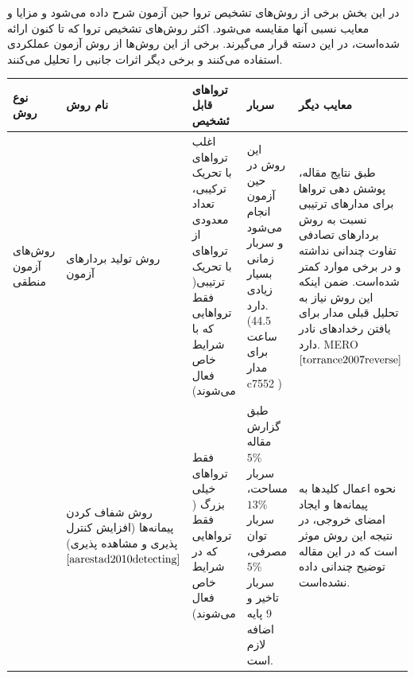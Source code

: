 در این بخش برخی از روش‌های تشخیص تروا حین آزمون شرح داده می‌شود و مزایا و معایب نسبی آنها مقایسه می‌شود. اکثر روش‌های تشخیص تروا که تا کنون ارائه شده‌است، در این دسته قرار می‌گیرند. برخی از این روش‌ها از روش آزمون عملکردی استفاده می‌کنند و برخی دیگر اثرات جانبی را تحلیل می‌کنند.
%
\begin{table}
	\label{tcomparison}
	\begin{tabular}{|p{1cm}||p{3cm}|p{3cm}|p{3cm}|p{3cm}|}
		\hline
		
		نوع روش & نام روش & تروا‌های قابل ئشخیص & سربار& معایب دیگر \\ \hline \hline
		روش‌ها‌‌ی آزمون منطقی& روش تولید بردارهای آزمون&اغلب تروا‌های با تحریک ترکیبی، تعداد معدودی از تروا‌های با تحریک ترتیبی( فقط تروا‌هایی که با شرایط خاص فعال می‌شوند)&این روش در حین آزمون انجام می‌شود و سربار زمانی بسیار زیادی دارد.(44.5 ساعت برای مدار c7552 )&طبق نتایج مقاله، پوشش دهی تروا‌ها برای مدارهای ترتیبی نسبت به روش بردارهای تصادفی تفاوت چندانی نداشته و در برخی موارد کمتر شده‌است. ضمن اینکه این روش نیاز به تحلیل قبلی مدار برای یافتن رخدادهای نادر دارد.
		MERO $\cite{torrance2007reverse}$
		\\ \cline{2-5}
		&روش شفاف کردن پیمانه‌ها (افزایش کنترل پذیری و مشاهده پذیری) $\cite{aarestad2010detecting}$ &فقط تروا‌های خیلی بزرگ ( فقط تروا‌هایی که در شرایط خاص فعال می‌شوند)&طبق گزارش مقاله $5\% $ سربار مساحت، $ 13\%$ سربار توان مصرفی، $5\%$ سربار تاخیر و 9 پایه اضافه لازم است. & نحوه اعمال کلیدها به پیمانه‌‌ها و ایجاد امضای خروجی، در نتیجه این روش موثر است که در این مقاله توضیح چندانی داده نشده‌است.
		
	\end{tabular}
\end{table}
\newpage
